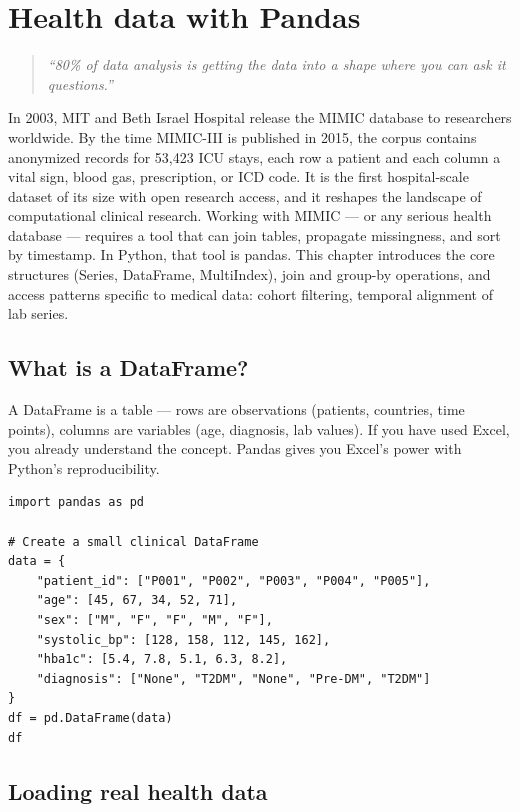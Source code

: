 \chapter{Health data with Pandas}
\label{ch:pandas}

\begin{quote}
\emph{``80\% of data analysis is getting the data into a shape where you can ask it questions.''}
\end{quote}

In 2003, MIT and Beth Israel Hospital release the MIMIC database to researchers worldwide. By the time MIMIC-III is published in 2015, the corpus contains anonymized records for 53{,}423 ICU stays, each row a patient and each column a vital sign, blood gas, prescription, or ICD code. It is the first hospital-scale dataset of its size with open research access, and it reshapes the landscape of computational clinical research. Working with MIMIC --- or any serious health database --- requires a tool that can join tables, propagate missingness, and sort by timestamp. In Python, that tool is pandas. This chapter introduces the core structures (Series, DataFrame, MultiIndex), join and group-by operations, and access patterns specific to medical data: cohort filtering, temporal alignment of lab series.

\section{What is a DataFrame?}

A DataFrame is a table --- rows are observations (patients, countries, time points), columns are variables (age, diagnosis, lab values). If you have used Excel, you already understand the concept. Pandas gives you Excel's power with Python's reproducibility.

\begin{verbatim}
import pandas as pd

# Create a small clinical DataFrame
data = {
    "patient_id": ["P001", "P002", "P003", "P004", "P005"],
    "age": [45, 67, 34, 52, 71],
    "sex": ["M", "F", "F", "M", "F"],
    "systolic_bp": [128, 158, 112, 145, 162],
    "hba1c": [5.4, 7.8, 5.1, 6.3, 8.2],
    "diagnosis": ["None", "T2DM", "None", "Pre-DM", "T2DM"]
}
df = pd.DataFrame(data)
df
\end{verbatim}

\section{Loading real health data}

